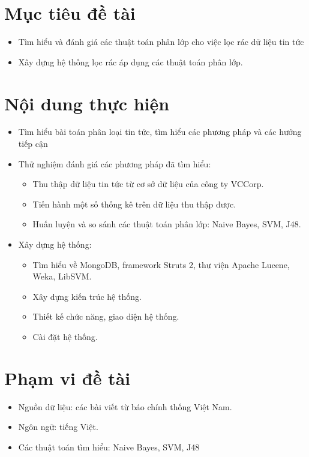 \section{Mục tiêu đề tài}
	\begin{itemize}
		\item Tìm hiểu và đánh giá các thuật toán phân lớp cho việc lọc rác dữ liệu tin tức
		\item Xây dựng hệ thống lọc rác áp dụng các thuật toán phân lớp.
	\end{itemize}

\section{Nội dung thực hiện}
	\begin{itemize}
		\item Tìm hiểu bài toán phân loại tin tức, tìm hiểu các phương pháp và các hướng tiếp cận
		\item Thử nghiệm đánh giá các phương pháp đã tìm hiểu:
		\begin{itemize}
			\item Thu thập dữ liệu tin tức từ cơ sở dữ liệu của công ty VCCorp.
			\item Tiến hành một số thống kê trên dữ liệu thu thập được.
			\item Huấn luyện và so sánh các thuật toán phân lớp: Naive Bayes, SVM, J48.
		\end{itemize}
	
		\item Xây dựng hệ thống:
		\begin{itemize}
			\item Tìm hiểu về MongoDB, framework Struts 2, thư viện Apache Lucene, Weka, LibSVM.
			\item Xây dựng kiến trúc hệ thống.
			\item Thiết kế chức năng, giao diện hệ thống.
			\item Cài đặt hệ thống.
		\end{itemize}
		
	\end{itemize}

\section{Phạm vi đề tài}
\begin{itemize}
	\item Nguồn dữ liệu: các bài viết từ báo chính thống Việt Nam.
	\item Ngôn ngữ: tiếng Việt.
	\item Các thuật toán tìm hiểu: Naive Bayes, SVM, J48
\end{itemize}

